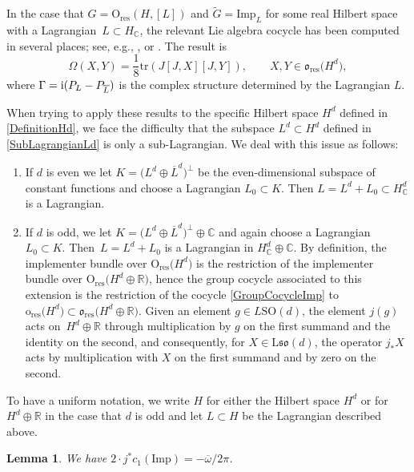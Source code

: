 \documentclass[11pt]{article}
\numberwithin{equation}{section}
\numberwithin{equation}{section}
\newtheorem{Lemma}[Theorem]{Lemma}
\newcommand{\R}{\mathbb{R}}
\newcommand{\C}{\mathbb{C}}
\newcommand{\tr}{\mathrm{tr}}
\newcommand{\SO}{\mathrm{SO}}
\newcommand{\res}{\mathrm{res}}
\newcommand{\Imp}{\mathrm{Imp}}
\renewcommand{\O}{\mathrm{O}}
\renewcommand{\L}{\mathrm{L}}
\begin{document}
In the case that $G = \O_{\res}(H, [L])$ and $\tilde{G} = \Imp_L$ for some real Hilbert space with a Lagrangian~$L \subset H_\C$, the relevant Lie algebra cocycle has been computed in several places; see, e.g., \cite[Theorem~6.10]{Araki1}, \cite[Theorem~10.2]{NeebSemibounded} or \cite[Theorem~6]{Ottesen}.
The result is
\begin{equation}
\label{GroupCocycleImp}
 \Omega(X, Y) = \frac{1}{8} \tr(J [J, X] [J, Y]), \qquad X, Y \in \mathfrak{o}_{\res}\big(H^d\big),
\end{equation}
where $\Gamma = {\rm i}(P_{L} - P_{\overline{L}})$ is the complex structure determined by the Lagrangian $L$.

When trying to apply these results to the specific Hilbert space $H^d$ defined in \eqref{DefinitionHd}, we face the difficulty that the subspace $L^d \subset H^d$ defined in \eqref{SubLagrangianLd} is only a sub-Lagrangian.
We deal with this issue as follows:
\begin{enumerate}\itemsep=0pt
\item[(i)]
If $d$ is even we let $K = \big(L^d \oplus \overline{L}^d\big)^\perp$ be the even-dimensional subspace of constant functions and choose a Lagrangian $L_0 \subset K$.
Then $L = L^d + L_0 \subset H^d_\C$ is a Lagrangian.
\item[(ii)]
If $d$ is odd, we let $K = \big(L^d \oplus \overline{L}^d\big)^\perp \oplus \C$ and again choose a Lagrangian $L_0 \subset K$.
Then~${L = L^d + L_0}$ is a Lagrangian in $H^d_\C \oplus \C$.
By definition, the implementer bundle over $\O_{\res}\big(H^d\big)$ is the restriction of the implementer bundle over $\O_{\res}\big(H^d \oplus \R\big)$, hence the group cocycle associated to this extension is the restriction of the cocycle \eqref{GroupCocycleImp} to~$\mathrm{o}_{\res}\big(H^d\big) \subset \mathfrak{o}_{\res}\big(H^d \oplus \R\big)$.
Given an element $g \in L\SO(d)$, the element $j(g)$ acts on~$H^d \oplus \R$ through multiplication by $g$ on the first summand and the identity on the second, and consequently, for $X \in \L \mathfrak{so}(d)$, the operator $j_*X$ acts by multiplication with $X$ on the first summand and by zero on the second.
\end{enumerate}
To have a uniform notation, we write $H$ for either the Hilbert space $H^d$ or for $H^d \oplus \R$ in the case that $d$ is odd and let $L \subset H$ be the Lagrangian described above.

\begin{Lemma}\label{LemmaA4}
 We have $2 \cdot j^*c_1(\Imp) = - \overline{\omega}/2\pi$.
\end{Lemma}
\end{document}
